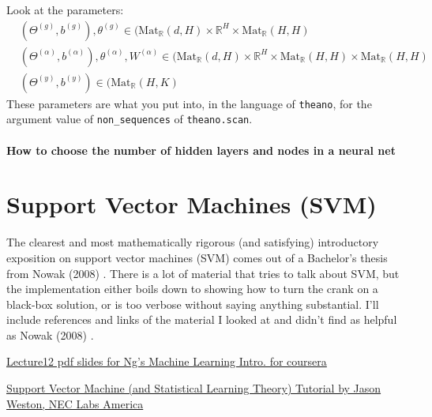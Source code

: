 \documentclass[10pt]{amsart}
\begin{document}
\begin{multicols*}{2}
Look at the parameters:
\begin{equation}
\begin{aligned}
  & (\Theta^{(g)},b^{(g)}), \theta^{(g)} \in (\text{Mat}_{\mathbb{R}}(d,H) \times \mathbb{R}^H \times \text{Mat}_{\mathbb{R}}(H,H) \\ 
  & (\Theta^{(\alpha)},b^{(\alpha)}), \theta^{(\alpha)}, W^{(\alpha)} \in (\text{Mat}_{\mathbb{R}}(d,H) \times \mathbb{R}^H \times \text{Mat}_{\mathbb{R}}(H,H) \times \text{Mat}_{\mathbb{R}}(H,H) \\
   & (\Theta^{(y)},b^{(y)})  \in (\text{Mat}_{\mathbb{R}}(H,K) 
  \end{aligned}
  \end{equation}
These parameters are what you put into, in the language of \verb|theano|, for the argument value of \verb|non_sequences| of \verb|theano.scan|.  

\subsection{How to choose the number of hidden layers and nodes in a neural net}



\part{Support Vector Machines (SVM)}

The clearest and most mathematically rigorous (and satisfying) introductory exposition on support vector machines (SVM) comes out of a Bachelor's thesis from Nowak (2008) \cite{Nowa2008}.  There is a lot of material that tries to talk about SVM, but the implementation either boils down to showing how to turn the crank on a black-box solution, or is too verbose without saying anything substantial.  I'll include references and links of the material I looked at and didn't find as helpful as Nowak (2008) \cite{Nowa2008}.  

\href{https://d18ky98rnyall9.cloudfront.net/_246c2a4e4c249f94c895f607ea1e6407_Lecture12.pdf?Expires=1490227200&Signature=VxrCShNSKNcYN9~2eHC~IQoQv11wIyqVGEMWVtaycFoimayg-XnGkJaBR4s~aIGf3nq~ck-W5ow4WM0-3vLuxfSkmhQflZH4Bx5fVo2w3R~bldnsJc91Bq-w27KZTw-Xanct~Cn7RnT0ViPlGYeUBmmrSoXAer5IZyPVdmbChzY_&Key-Pair-Id=APKAJLTNE6QMUY6HBC5A}{Lecture12 pdf slides for Ng's Machine Learning Intro. for coursera}

\href{http://www.cs.columbia.edu/~kathy/cs4701/documents/jason_svm_tutorial.pdf}{Support Vector Machine
(and Statistical Learning Theory) Tutorial by Jason Weston, NEC Labs America}


\end{multicols*}
\end{document}
